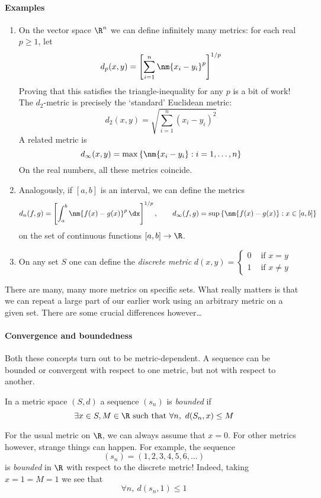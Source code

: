 \paragraph{Examples}
\begin{enumerate}
  \item On the vector space $\R^n$ we can define infinitely many metrics: for each real $p\ge 1$, let
  \[d_p(x,y)=\left[\sum\limits_{i=1}^n\nm{x_i-y_i}^p\right]^{1/p}\]
  Proving that this satisfies the triangle-inequality for any $p$ is a bit of work! The $d_2$-metric is precisely the `standard' Euclidean metric:
  \[d_2(x,y)=\sqrt{\sum\limits_{i=1}^n(x_i-y_i)^2}\]
  A related metric is
  \[d_\infty(x,y)=\max\left\{\nm{x_i-y_i}:i=1,\ldots,n\right\}\]
  On the real numbers, all these metrics coincide.
  \item Analogously, if $[a,b]$ is an interval, we can define the metrics
  \begin{gather*}
  d_n(f,g)=\left[\int_a^b\nm{f(x)-g(x)}^p\,\dx\right]^{1/p},\qquad
  d_\infty(f,g)=\sup\left\{\nm{f(x)-g(x)}:x\in[a,b]\right\}
  \end{gather*}
  on the set of continuous functions $[a,b]\to\R$.
  \item On any set $S$ one can define the \emph{discrete metric} $d(x,y)=\begin{cases}
  0&\text{ if $x=y$}\\
  1&\text{ if $x\neq y$}
  \end{cases}$
\end{enumerate}
There are many, many more metrics on specific sets. What really matters is that we can repeat a large part of our earlier work using an arbitrary metric on a given set. There are some crucial differences however\ldots

\paragraph{Convergence and boundedness}

Both these concepts turn out to be metric-dependent. A sequence can be bounded or convergent with respect to one metric, but not with respect to another.

\begin{defn}
In a metric space $(S,d)$ a sequence $(s_n)$ is \emph{bounded} if
\[\exists x\in S, M\in\R\text{ such that }\forall n,\ d(S_n,x)\le M\]
\end{defn}
For the usual metric on $\R$, we can always assume that $x=0$. For other metrics however, strange things can happen. For example, the sequence
\[(s_n)=(1,2,3,4,5,6,\ldots)\]
is \emph{bounded} in $\R$ with respect to the discrete metric! Indeed, taking $x=1=M=1$ we see that
\[\forall n,\ d(s_n,1)\le 1\]

